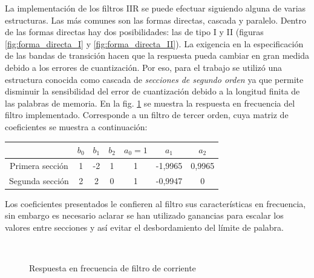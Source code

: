 La implementación de los filtros IIR se puede efectuar siguiendo alguna de varias estructuras. Las más comunes son las formas directas, cascada y paralelo. Dentro
de las formas directas hay dos posibilidades: las de tipo I y II (figuras \ref{fig:forma_directa_I} y \ref{fig:forma_directa_II}). 
La exigencia en la especificación de las bandas de transición hacen que la respuesta pueda cambiar en gran medida debido a los errores de cuantización.
Por eso, para el trabajo se utilizó una estructura conocida como cascada de \emph{secciones de segundo orden} ya que permite disminuir la sensibilidad del error de
cuantización debido a la longitud finita de las palabras de memoria. En la fig. \ref{fig:respuesta_filtro_corriente} se muestra la respuesta en frecuencia del filtro 
implementado. Corresponde a un filtro de tercer orden, cuya matriz de coeficientes se muestra a continuación:

\begin{tabular}{|c|c|c|c|c|c|c|}
 \hline
		&	$b_0$	&	$b_1$	&	$b_2$	&	$a_0=1$	&	$a_1$	&	$a_2$	\\ \hline
Primera sección	&	1	&	-2	&	1	&	1	&	-1,9965	&	0,9965	\\
Segunda sección	&	2	&	2	&	0	&	1	&	-0,9947	&	0	\\ \hline
\end{tabular}

Los coeficientes presentados le confieren al filtro sus características en frecuencia, sin embargo es necesario aclarar se han utilizado ganancias
para escalar los valores entre secciones y así evitar el desbordamiento del límite de palabra.

\begin{figure}[H]
 \centering
  \\
 \caption{Respuesta en frecuencia de filtro de corriente}
 \label{fig:respuesta_filtro_corriente}
\end{figure}


